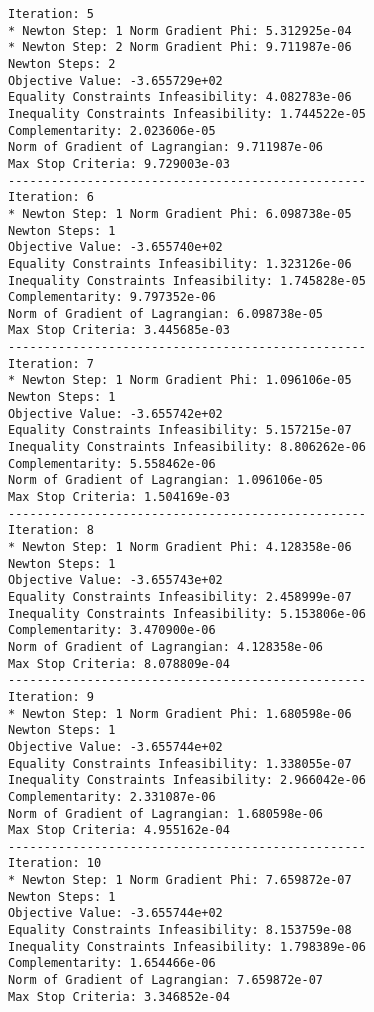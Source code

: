 \documentclass{article}
\begin{document}
\begin{minipage}[t]{0.45\textwidth}
\begin{verbatim}
Iteration: 5
* Newton Step: 1 Norm Gradient Phi: 5.312925e-04
* Newton Step: 2 Norm Gradient Phi: 9.711987e-06
Newton Steps: 2
Objective Value: -3.655729e+02
Equality Constraints Infeasibility: 4.082783e-06
Inequality Constraints Infeasibility: 1.744522e-05
Complementarity: 2.023606e-05
Norm of Gradient of Lagrangian: 9.711987e-06
Max Stop Criteria: 9.729003e-03
--------------------------------------------------
Iteration: 6
* Newton Step: 1 Norm Gradient Phi: 6.098738e-05
Newton Steps: 1
Objective Value: -3.655740e+02
Equality Constraints Infeasibility: 1.323126e-06
Inequality Constraints Infeasibility: 1.745828e-05
Complementarity: 9.797352e-06
Norm of Gradient of Lagrangian: 6.098738e-05
Max Stop Criteria: 3.445685e-03
--------------------------------------------------
Iteration: 7
* Newton Step: 1 Norm Gradient Phi: 1.096106e-05
Newton Steps: 1
Objective Value: -3.655742e+02
Equality Constraints Infeasibility: 5.157215e-07
Inequality Constraints Infeasibility: 8.806262e-06
Complementarity: 5.558462e-06
Norm of Gradient of Lagrangian: 1.096106e-05
Max Stop Criteria: 1.504169e-03
--------------------------------------------------
Iteration: 8
* Newton Step: 1 Norm Gradient Phi: 4.128358e-06
Newton Steps: 1
Objective Value: -3.655743e+02
Equality Constraints Infeasibility: 2.458999e-07
Inequality Constraints Infeasibility: 5.153806e-06
Complementarity: 3.470900e-06
Norm of Gradient of Lagrangian: 4.128358e-06
Max Stop Criteria: 8.078809e-04
--------------------------------------------------
Iteration: 9
* Newton Step: 1 Norm Gradient Phi: 1.680598e-06
Newton Steps: 1
Objective Value: -3.655744e+02
Equality Constraints Infeasibility: 1.338055e-07
Inequality Constraints Infeasibility: 2.966042e-06
Complementarity: 2.331087e-06
Norm of Gradient of Lagrangian: 1.680598e-06
Max Stop Criteria: 4.955162e-04
--------------------------------------------------
Iteration: 10
* Newton Step: 1 Norm Gradient Phi: 7.659872e-07
Newton Steps: 1
Objective Value: -3.655744e+02
Equality Constraints Infeasibility: 8.153759e-08
Inequality Constraints Infeasibility: 1.798389e-06
Complementarity: 1.654466e-06
Norm of Gradient of Lagrangian: 7.659872e-07
Max Stop Criteria: 3.346852e-04
\end{verbatim}
\end{minipage}
\end{document}
